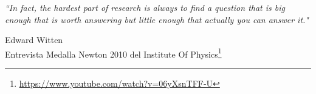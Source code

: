 \documentclass[12pt, letter, twoside]{Thesis} %
\title{\ttitle} %
\newcommand\blankpage{%
    \null
    \thispagestyle{empty}%
    \addtocounter{page}{-1}%
    \newpage}
\begin{document}
\frontmatter %


\fancyhead{} %
\rhead{\thepage} %
\lhead{} %

\pagestyle{fancy} %

\newcommand{\HRule}{\rule{\linewidth}{0.5mm}} %

\hypersetup{pdfsubject=\subjectname}
\hypersetup{pdfauthor=\authornames}
\hypersetup{pdfkeywords=\keywordnames}



\afterpage{\blankpage}
\clearpage





\afterpage{\blankpage}


\pagestyle{empty} %

\null\vfill\vfill\vfill\vfill %

\textit{``In fact, the hardest part of research is always to find a  question that  is
 big enough that is worth answering  but little enough that actually you can answer it."}

\begin{flushright}
Edward Witten\\
Entrevista Medalla Newton 2010 del Institute Of Physics\footnote{\url{https://www.youtube.com/watch?v=06yXsnTFF-U}}
\end{flushright}
\end{document}
